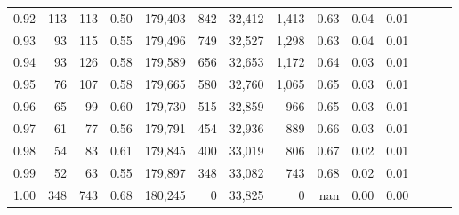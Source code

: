 \begin{tabular}{rrrrrrrrrrrrrr}
0.92 &    113 &  113 &  0.50 &  179,403 &      842 &  32,412 &   1,413 &  0.63 &  0.04 &      0.01 \\
0.93 &     93 &  115 &  0.55 &  179,496 &      749 &  32,527 &   1,298 &  0.63 &  0.04 &      0.01 \\
0.94 &     93 &  126 &  0.58 &  179,589 &      656 &  32,653 &   1,172 &  0.64 &  0.03 &      0.01 \\
0.95 &     76 &  107 &  0.58 &  179,665 &      580 &  32,760 &   1,065 &  0.65 &  0.03 &      0.01 \\
0.96 &     65 &   99 &  0.60 &  179,730 &      515 &  32,859 &     966 &  0.65 &  0.03 &      0.01 \\
0.97 &     61 &   77 &  0.56 &  179,791 &      454 &  32,936 &     889 &  0.66 &  0.03 &      0.01 \\
0.98 &     54 &   83 &  0.61 &  179,845 &      400 &  33,019 &     806 &  0.67 &  0.02 &      0.01 \\
0.99 &     52 &   63 &  0.55 &  179,897 &      348 &  33,082 &     743 &  0.68 &  0.02 &      0.01 \\
1.00 &    348 &  743 &  0.68 &  180,245 &        0 &  33,825 &       0 &   nan &  0.00 &      0.00 \\
\bottomrule
\end{tabular}
